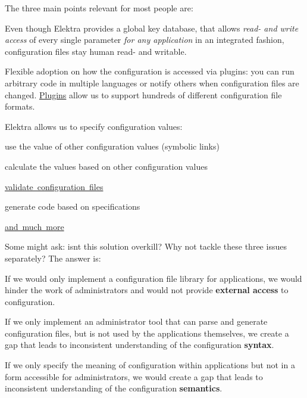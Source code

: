 The three main points relevant for most people are\+:


\begin{DoxyEnumerate}
\item Even though Elektra provides a global key database, that allows {\itshape read-\/ and write access} of every single parameter {\itshape for any application} in an integrated fashion, configuration files stay human read-\/ and writable.
\item Flexible adoption on how the configuration is accessed via plugins\+: you can run arbitrary code in multiple languages or notify others when configuration files are changed. \mbox{\hyperlink{src_plugins_README_md}{Plugins}} allow us to support hundreds of different configuration file formats.
\item Elektra allows us to specify configuration values\+:
\begin{DoxyItemize}
\item use the value of other configuration values (symbolic links)
\item calculate the values based on other configuration values
\item \mbox{\hyperlink{validation.md_doc_tutorials_validation_md}{validate configuration files}}
\item generate code based on specifications
\item \mbox{\hyperlink{src_plugins_README_md}{and much more}}
\end{DoxyItemize}
\end{DoxyEnumerate}

Some might ask\+: isn\textquotesingle{}t this solution overkill? Why not tackle these three issues separately? The answer is\+:


\begin{DoxyEnumerate}
\item If we would only implement a configuration file library for applications, we would hinder the work of administrators and would not provide {\bfseries{external access}} to configuration.
\item If we only implement an administrator tool that can parse and generate configuration files, but is not used by the applications themselves, we create a gap that leads to inconsistent understanding of the configuration {\bfseries{syntax}}.
\item If we only specify the meaning of configuration within applications but not in a form accessible for administrators, we would create a gap that leads to inconsistent understanding of the configuration {\bfseries{semantics}}.
\end{DoxyEnumerate}

